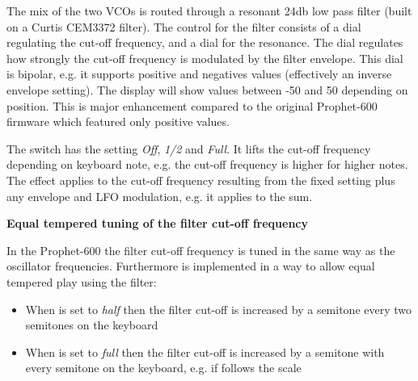 The mix of the two VCOs is routed through a resonant 24db low pass filter (built on a Curtis CEM3372 filter). The control for the filter consists of a \filtercutoff dial regulating the cut-off frequency, and a \filterres dial for the resonance. The \filterenv dial regulates how strongly the cut-off frequency is modulated by the filter envelope. This dial is bipolar, e.g. it supports positive and negatives values (effectively an inverse envelope setting). The display will show values between -50 and 50 depending on position. This is major enhancement compared to the original Prophet-600 firmware which  featured only positive values.

\begin{center}
\end{center}

The \keyboardtrack switch has the setting \textit{Off}, \textit{1/2} and \textit{Full}. It lifts the cut-off frequency depending on keyboard note, e.g. the cut-off frequency is higher for higher notes. The effect applies to the cut-off frequency resulting from the fixed \filtercutoff setting plus any envelope and LFO modulation, e.g. it applies to the sum.  

\textbf{Equal tempered tuning of the filter cut-off frequency}

In the Prophet-600 the filter cut-off frequency is tuned in the same way as the oscillator frequencies. Furthermore \keyboardtrack is implemented in a way to allow equal tempered play using the filter:

\begin{itemize}
  \item When \keyboardtrack is set to \textit{half} then the filter cut-off is increased by a semitone every two semitones on the keyboard 
  \item When \keyboardtrack is set to \textit{full} then the filter cut-off is increased by a semitone with every semitone on the keyboard, e.g. if follows the scale 
\end{itemize}

